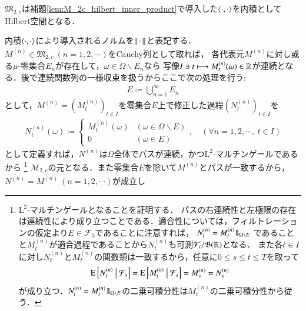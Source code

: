 	\begin{screen}
		\begin{prp}
			$\mathfrak{M}_{2,c}$は補題\ref{lem:M_2c_hilbert_inner_product}で導入した$\inprod<\cdot,\cdot>$を内積としてHilbert空間となる．
		\end{prp}
	\end{screen}
			
	\begin{prf}
			内積$\inprod<\cdot,\cdot>$により導入されるノルムを$\left\|\, \cdot\, \right\|_{}$と表記する．
			$\overline{M^{(n)}} \in \mathfrak{M}_{2,c}\ (n=1,2,\cdots)$をCauchy列として取れば，
			各代表元$M^{(n)}$に対し或る$\mu$-零集合$E_n$が存在して，$\omega \in \Omega \backslash E_n$なら
			写像$I \ni t \longmapsto M^{(n)}_t(\omega) \in \mathbb{R}$が連続となる．後で連続関数列の一様収束を扱うからここで次の処理を行う:
			\begin{align}
				E \coloneqq \bigcup_{n=1}^{\infty} E_n
			\end{align}
			として，$M^{(n)} = (M^{(n)}_t)_{t \in I}$を零集合$E$上で修正した過程$(N^{(n)}_t)_{t \in I}$を
			\begin{align}
				N^{(n)}_t(\omega) \coloneqq
				\begin{cases}
					M^{(n)}_t(\omega) & (\omega \in \Omega \backslash E) \\
					0 & (\omega \in E)
				\end{cases}
				,\quad (\forall n = 1,2,\cdots,\ t \in I)
			\end{align}
		として定義すれば，$N^{(n)}$は$\Omega$全体でパスが連続，かつ$\mathrm{L}^2$-マルチンゲールであるから
		\footnote{
			$\mathrm{L}^2$-マルチンゲールとなることを証明する．
			パスの右連続性と左極限の存在は連続性により成り立つことである．適合性については，フィルトレーションの仮定より$E \in \mathcal{F}_0$であることに注意すれば，
			$N^{(n)}_t = M^{(n)}_t \mbox{1}\hspace{-0.25em}\mbox{l}_{\Omega \backslash E}$
			であることと$M^{(n)}_t$が適合過程であることから$N^{(n)}_t$も可測$\mathcal{F}_t/\mathfrak{B}(\mathbb{R})$となる．
			また各$t \in I$に対し$N^{(n)}_t$と$M^{(n)}_t$の関数類は一致するから，任意に$0 \leq s \leq t \leq T$を取って
			\begin{align}
				\operatorname{E} \left[ N^{(n)}_t \ \middle|\ \mathcal{F}_s \right] = \operatorname{E} \left[ M^{(n)}_t \ \middle|\ \mathcal{F}_s \right] = M^{(n)}_s = N^{(n)}_s
			\end{align}
			が成り立つ．$N^{(n)}_t = M^{(n)}_t \mbox{1}\hspace{-0.25em}\mbox{l}_{\Omega \backslash E}$の二乗可積分性は$M^{(n)}_t$の二乗可積分性から従う．
		}
		$\mathcal{M}_{2,c}$の元となる．また零集合$E$を除いて$M^{(n)}$とパスが一致するから，
		$\overline{N^{(n)}} = \overline{M^{(n)}}\ (n=1,2,\cdots)$が成立し

\end{prf}
